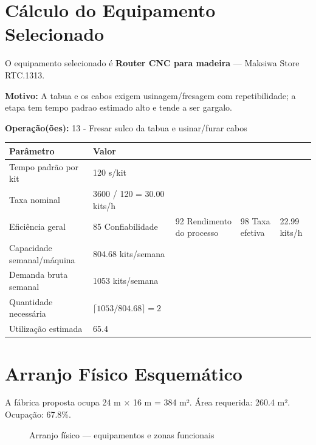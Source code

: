 \documentclass[12pt,a4paper,oneside,english,brazil]{abntex2}
\begin{document}
\chapter{Cálculo do Equipamento Selecionado}
O equipamento selecionado é \textbf{Router CNC para madeira} --- Maksiwa Store RTC.1313.

\textbf{Motivo:} A tabua e os cabos exigem usinagem/fresagem com repetibilidade; a etapa tem tempo padrao estimado alto e tende a ser gargalo.

\textbf{Operação(ões):} 13 - Fresar sulco da tabua e usinar/furar cabos

\begin{table}[H]
\begin{tabular}{ll}
\toprule
Parâmetro & Valor \\
\midrule
  Tempo padrão por kit & 120 s/kit \\
  Taxa nominal & 3600 / 120 = 30.00 kits/h \\
  Eficiência geral & 85%
  Confiabilidade & 92%
  Rendimento do processo & 98%
  Taxa efetiva & 22.99 kits/h \\
  Capacidade semanal/máquina & 804.68 kits/semana \\
  Demanda bruta semanal & 1053 kits/semana \\
  Quantidade necessária & $\lceil 1053 / 804.68 \rceil = 2$ \\
  Utilização estimada & 65.4%
\bottomrule
\end{tabular}
{}
\end{table}

\chapter{Arranjo Físico Esquemático}
A fábrica proposta ocupa 24 m × 16 m = 384 m². Área requerida: 260.4 m². Ocupação: 67.8\%.

\begin{figure}[H]
  \centering
  
  \caption{Arranjo físico --- equipamentos e zonas funcionais}
\end{figure}
\end{document}
